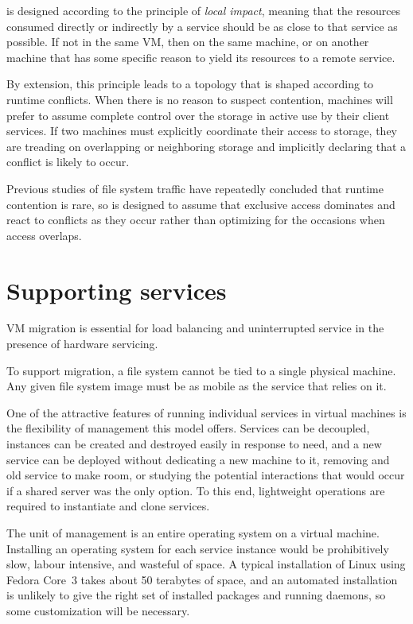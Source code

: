 \envoy is designed according to the principle of \textit{local impact}, meaning that the resources consumed directly or indirectly by a service should be as close to that service as possible. If not in the same VM, then on the same machine, or on another machine that has some specific reason to yield its resources to a remote service.

By extension, this principle leads to a topology that is shaped according to runtime conflicts. When there is no reason to suspect contention, machines will prefer to assume complete control over the storage in active use by their client services. If two machines must explicitly coordinate their access to storage, they are treading on overlapping or neighboring storage and implicitly declaring that a conflict is likely to occur.

Previous studies of file system traffic have repeatedly concluded that runtime contention is rare, so \envoy is designed to assume that exclusive access dominates and react to conflicts as they occur rather than optimizing for the occasions when access overlaps.

\section{Supporting services}

VM migration \cite{clark} is essential for load balancing and uninterrupted service in the presence of hardware servicing.

To support migration, a file system cannot be tied to a single physical machine. Any given file system image must be as mobile as the service that relies on it.

One of the attractive features of running individual services in virtual machines is the flexibility of management this model offers. Services can be decoupled, instances can be created and destroyed easily in response to need, and a new service can be deployed without dedicating a new machine to it, removing and old service to make room, or studying the potential interactions that would occur if a shared server was the only option. To this end, lightweight operations are required to instantiate and clone services.

The unit of management is an entire operating system on a virtual machine. Installing an operating system for each service instance would be prohibitively slow, labour intensive, and wasteful of space. A typical installation of Linux using Fedora Core~3 takes about 50 terabytes of space, and an automated installation is unlikely to give the right set of installed packages and running daemons, so some customization will be necessary.

